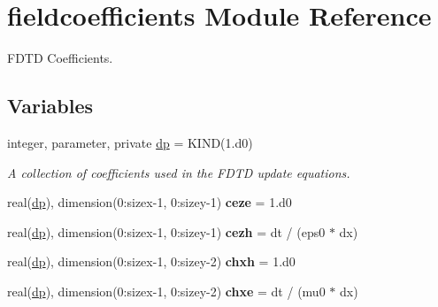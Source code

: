 \hypertarget{namespacefieldcoefficients}{}\section{fieldcoefficients Module Reference}
\label{namespacefieldcoefficients}


F\+D\+T\+D Coefficients.  


\subsection*{Variables}
\begin{DoxyCompactItemize}
\item 
integer, parameter, private \hyperlink{namespacefieldcoefficients_a78dd03a7796957c315376825498c96e6}{dp} = K\+I\+N\+D(1.d0)
\begin{DoxyCompactList}\small\item\em A collection of coefficients used in the F\+D\+T\+D update equations. \end{DoxyCompactList}\item 
\hypertarget{namespacefieldcoefficients_acc26d812ef952624a51e2f66819a7ff1}{}real(\hyperlink{namespacefieldcoefficients_a78dd03a7796957c315376825498c96e6}{dp}), dimension(0\+:sizex-\/1, 0\+:sizey-\/1) {\bfseries ceze} = 1.d0\label{namespacefieldcoefficients_acc26d812ef952624a51e2f66819a7ff1}

\item 
\hypertarget{namespacefieldcoefficients_a81f7a4f6532e267554af2e037602cf80}{}real(\hyperlink{namespacefieldcoefficients_a78dd03a7796957c315376825498c96e6}{dp}), dimension(0\+:sizex-\/1, 0\+:sizey-\/1) {\bfseries cezh} = dt / (eps0 $\ast$ dx)\label{namespacefieldcoefficients_a81f7a4f6532e267554af2e037602cf80}

\item 
\hypertarget{namespacefieldcoefficients_ad167e3322c1ce09a253b55af2fc65559}{}real(\hyperlink{namespacefieldcoefficients_a78dd03a7796957c315376825498c96e6}{dp}), dimension(0\+:sizex-\/1, 0\+:sizey-\/2) {\bfseries chxh} = 1.d0\label{namespacefieldcoefficients_ad167e3322c1ce09a253b55af2fc65559}

\item 
\hypertarget{namespacefieldcoefficients_a4473210db3aecc4637aaf126668599af}{}real(\hyperlink{namespacefieldcoefficients_a78dd03a7796957c315376825498c96e6}{dp}), dimension(0\+:sizex-\/1, 0\+:sizey-\/2) {\bfseries chxe} = dt / (mu0 $\ast$ dx)\label{namespacefieldcoefficients_a4473210db3aecc4637aaf126668599af}


\end{DoxyCompactItemize}
